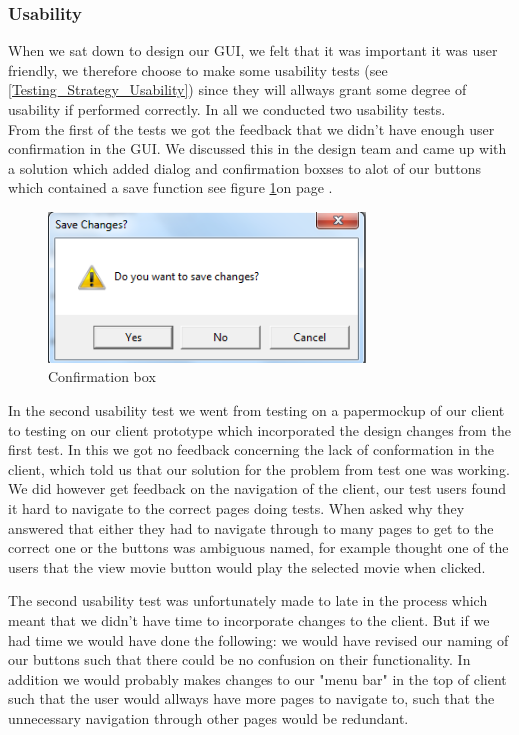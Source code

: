 \subsubsection{Usability}
\label{Design_Client_GUI_Usability}
When we sat down to design our GUI, we felt that it was important it was user friendly, we therefore choose to make some usability tests (see \ref{Testing_Strategy_Usability}) since they will allways grant some degree of usability if performed correctly. In all we conducted two usability tests.
\\From the first of the tests we got the feedback that we didn't have enough user confirmation in the GUI. We discussed this in the design team and came up with a solution which added dialog and confirmation boxses to alot of our buttons which contained a save function see figure \ref{fig:Design_Client_GUI_Usability_popup}on page \pageref{fig:Design_Client_GUI_Usability_popup}.

\begin{figure}[h!]
\caption{Confirmation box}
\label{fig:Design_Client_GUI_Usability_popup}
  \centering
\includegraphics[width=0.75\textwidth]{Parts/Images/Design/Confirmationbox}
\end{figure}

In the second usability test we went from testing on a papermockup of our client to testing on our client prototype which incorporated the design changes from the first test. In this we got no feedback concerning the lack of conformation in the client, which told us that our solution for the problem from test one was working. We did however get feedback on the navigation of the client, our test users found it hard to navigate to the correct pages doing tests. When asked why they answered that either they had to navigate through to many pages to get to the correct one or the buttons was ambiguous named, for example thought one of the users that the view movie button would play the selected movie when clicked.

The second usability test was unfortunately made to late in the process which meant that we didn't have time to incorporate changes to the client. But if we had time we would have done the following: we would have revised our naming of our buttons such that there could be no confusion on their functionality. In addition we would probably makes changes to our "menu bar" in the top of client such that the user would allways have more pages to navigate to, such that the unnecessary navigation through other pages would be redundant.
